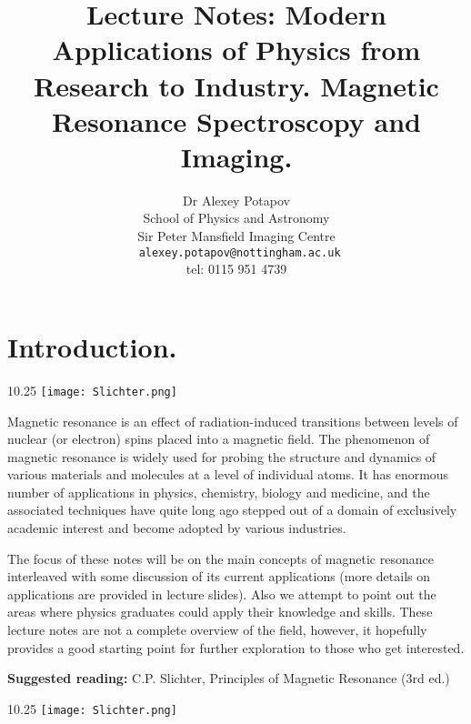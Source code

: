 \documentclass[a4paper, 12pt]{article}
\begin{document}
\title{ Lecture Notes: Modern Applications of Physics from Research to Industry. Magnetic Resonance Spectroscopy and Imaging.}
\author{Dr Alexey Potapov\\
School of Physics and Astronomy\\
Sir Peter Mansfield Imaging Centre \\
\texttt{ alexey.potapov@nottingham.ac.uk}\\
tel: 0115 951 4739 }
\maketitle



 



\section{Introduction.}

\begin{wrapfigure}{1}{0.25\textwidth}
	\texttt{[image: Slichter.png]}
\end{wrapfigure}

Magnetic resonance is an effect of radiation-induced transitions between levels of nuclear (or electron) spins placed into a magnetic field. The phenomenon of magnetic resonance is widely used for probing the structure and dynamics of various materials and molecules at a level of individual atoms. It has enormous number of applications in physics, chemistry, biology and medicine, and the associated techniques have quite long ago stepped out of a domain of exclusively academic interest and become adopted by various industries.

The focus of these notes will be on the main concepts of magnetic resonance interleaved with some discussion of its current applications (more details on applications are provided in lecture slides). Also we attempt to point out the areas where physics graduates could apply their knowledge and skills. These lecture notes are not a complete overview of the field, however, it hopefully provides a good starting point for further exploration to those who get interested.

\textbf{Suggested reading:} C.P. Slichter, Principles of Magnetic Resonance (3rd ed.)



\begin{wrapfigure}{1}{0.25\textwidth}
\texttt{[image: Slichter.png]}
\end{wrapfigure}
\end{document}

